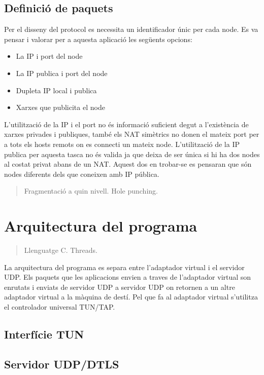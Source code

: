 \subsection{Definició de paquets}
Per el disseny del protocol es necessita un identificador únic per cada node. Es va pensar i valorar per a aquesta aplicació les següents opcions:
\begin{itemize}
\item La IP i port del node
\item La IP publica i port del node
\item Dupleta IP local i publica
\item Xarxes que publicita el node
\end{itemize}
L'utilització de la IP i el port no és informació suficient degut a l'existència de xarxes privades i publiques, també els NAT simètrics no donen el mateix port per a tots els hosts remots on es connecti un mateix node.
L'utilització de la IP publica per aquesta tasca no és valida ja que deixa de ser única si hi ha dos nodes al costat privat abans de un NAT. Aquest dos en trobar-se es pensaran que són nodes diferents dels que coneixen amb IP pública.

\begin{quote}
Fragmentació a quin nivell.
Hole punching.
\end{quote}

\section{Arquitectura del programa}
\begin{quote}
Llenguatge C.
Threads.
\end{quote}
La arquitectura del programa es separa entre l'adaptador virtual i el servidor UDP. Els paquets que les aplicacions envien a traves de l'adaptador virtual son enrutats i enviats de servidor UDP a servidor UDP on retornen a un altre adaptador virtual a la màquina de destí.
Pel que fa al adaptador virtual s'utilitza el controlador universal TUN/TAP.
\subsection{Interfície TUN}

\subsection{Servidor UDP/DTLS}
